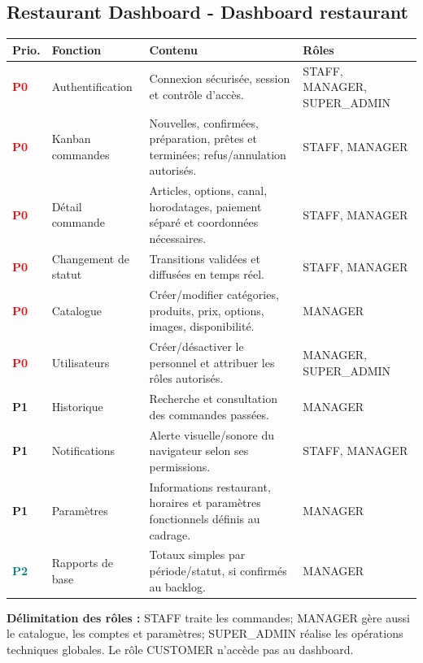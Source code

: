 \documentclass[10pt,a4paper]{article}
\newcommand{\tagbox}[2]{\colorbox{#1!14}{\textcolor{#1}{\textbf{\scriptsize #2}}}}
\newcommand{\Pzero}{\tagbox{red}{P0}}
\newcommand{\Pone}{\tagbox{amber}{P1}}
\newcommand{\Ptwo}{\tagbox{teal}{P2}}
\begin{document}
\subsection{Restaurant Dashboard - Dashboard restaurant}
\begin{longtable}{@{}L{1.1cm}L{3.4cm}L{6.7cm}L{4.0cm}@{}}
\toprule
\textbf{Prio.} & \textbf{Fonction} & \textbf{Contenu} & \textbf{Rôles} \\
\midrule
\endhead
\Pzero & Authentification & Connexion sécurisée, session et contrôle d'accès. & STAFF, MANAGER, SUPER\_ADMIN \\
\Pzero & Kanban commandes & Nouvelles, confirmées, préparation, prêtes et terminées; refus/annulation autorisés. & STAFF, MANAGER \\
\Pzero & Détail commande & Articles, options, canal, horodatages, paiement séparé et coordonnées nécessaires. & STAFF, MANAGER \\
\Pzero & Changement de statut & Transitions validées et diffusées en temps réel. & STAFF, MANAGER \\
\Pzero & Catalogue & Créer/modifier catégories, produits, prix, options, images, disponibilité. & MANAGER \\
\Pzero & Utilisateurs & Créer/désactiver le personnel et attribuer les rôles autorisés. & MANAGER, SUPER\_ADMIN \\
\Pone & Historique & Recherche et consultation des commandes passées. & MANAGER \\
\Pone & Notifications & Alerte visuelle/sonore du navigateur selon ses permissions. & STAFF, MANAGER \\
\Pone & Paramètres & Informations restaurant, horaires et paramètres fonctionnels définis au cadrage. & MANAGER \\
\Ptwo & Rapports de base & Totaux simples par période/statut, si confirmés au backlog. & MANAGER \\
\bottomrule
\end{longtable}
\textbf{Délimitation des rôles :} STAFF traite les commandes; MANAGER gère aussi le catalogue, les comptes et paramètres; SUPER\_ADMIN réalise les opérations techniques globales. Le rôle CUSTOMER n'accède pas au dashboard.

\clearpage
\end{document}
